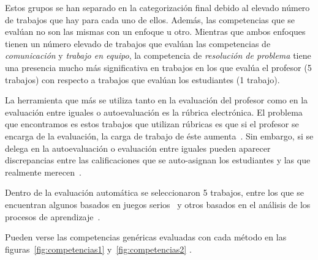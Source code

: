 Estos grupos se han separado en la categorización final debido al elevado número de trabajos que hay para cada uno de ellos. Además, las competencias que se evalúan no son las mismas con un enfoque u otro. Mientras que ambos enfoques tienen un número elevado de trabajos que evalúan las competencias de \emph{comunicación} y \emph{trabajo en equipo}, la competencia de \emph{resolución de problema} tiene una presencia mucho más significativa en trabajos en los que evalúa el profesor (5 trabajos) con respecto a trabajos que evalúan los estudiantes (1 trabajo).

La herramienta que más se utiliza tanto en la evaluación del profesor como en la evaluación entre iguales o autoevaluación es la rúbrica electrónica. El problema que encontramos es estos trabajos que utilizan rúbricas es que si el profesor se encarga de la evaluación, la carga de trabajo de éste aumenta~\cite{lacuesta2009active}. Sin embargo, si se delega en la autoevaluación o evaluación entre iguales pueden aparecer discrepancias entre las calificaciones que se auto-asignan los estudiantes y las que realmente merecen~\cite{carreras2013promotion}. 

Dentro de la evaluación automática se seleccionaron 5 trabajos, entre los que se encuentran algunos basados en juegos serios~\cite{djaouti2011classifying,bedek2011behavioral} y otros basados en el análisis de los procesos de aprendizaje~\cite{rayon2014web,fidalgo:2015}.

Pueden verse las competencias genéricas evaluadas con cada método en las figuras~\ref{fig:competencias1} y~\ref{fig:competencias2} .

